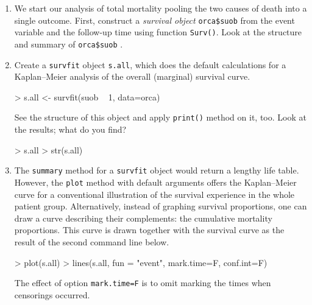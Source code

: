 \begin{enumerate}
\item We start our analysis of total mortality pooling the two causes of death into
a single outcome.
First, construct a {\it survival object} \verb!orca$suob! from
the event variable and the follow-up time using function \verb+Surv()+.
Look at the structure and summary of \verb!orca$suob! .
\begin{Schunk}
\end{Schunk}

\item Create a {\tt survfit} object {\tt s.all}, which does the
default calculations for a Kaplan--Meier
analysis of the overall (marginal) survival curve.
\begin{Schunk}
\begin{Sinput}
> s.all <- survfit(suob ~ 1, data=orca)
\end{Sinput}
\end{Schunk}

See the structure of this object and apply {\tt print()} method on it, too.
Look at the results; what do you find?
\begin{Schunk}
\begin{Sinput}
> s.all
> str(s.all)
\end{Sinput}
\end{Schunk}

\item
The \texttt{summary} method for
 a  \texttt{survfit} object would return a lengthy life table.
However, the \texttt{plot} method with default
arguments offers the Kaplan--Meier curve
for a conventional illustration of the survival experience in the whole patient group.
 Alternatively, instead of graphing survival proportions,
one can draw a curve describing their complements: the cumulative mortality proportions. This curve is drawn together with the survival curve as the
 result of the second command line below.
\begin{Schunk}
\begin{Sinput}
> plot(s.all)
> lines(s.all, fun = "event", mark.time=F, conf.int=F)
\end{Sinput}
\end{Schunk}

The effect of option {\tt mark.time=F} is to omit
marking the times when censorings occurred.

\end{enumerate}

